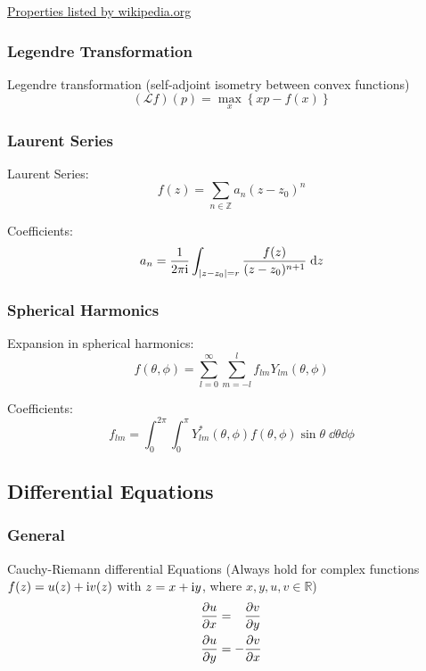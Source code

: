 			\noindent
			\href{https://en.wikipedia.org/wiki/Fourier_transform#Functional_relationships,_one-dimensional}{Properties listed by wikipedia.org}

		\subsubsection{Legendre Transformation}
			\noindent
			Legendre transformation (self-adjoint isometry between convex functions)
			\begin{equation}
				(\mathcal{L}f)(p)=\max_x\left\lbrace xp-f(x) \right\rbrace
			\end{equation}


		\subsubsection{Laurent Series}
			\noindent
			Laurent Series:
			\begin{equation}
				f(z)=\sum_{n\in\mathbb{Z}} a_n(z-z_0)^n
			\end{equation}

			\noindent
			Coefficients:
			\begin{equation}
				a_n = \frac{1}{2 \pi \mathrm{i}}\int_{\abs{ z-z_0 } = r} \frac{f(z)}{(z-z_0)^{n+1}}\;\dd z
			\end{equation}

		\subsubsection{Spherical Harmonics}
			\noindent
			Expansion in spherical harmonics:
			\begin{equation}
				f(\theta, \phi) = \sum_{l=0}^{\infty} \sum_{m=-l}^{l} f_{lm} Y_{lm}(\theta,\phi)
			\end{equation}

			\noindent
			Coefficients:
			\begin{equation}
				f_{lm} = \int_0^{2\pi} \int_0^\pi Y_{lm}^{*}(\theta,\phi) f(\theta,\phi) \sin\theta\;\dd\theta\dd\phi
			\end{equation}

	\subsection{Differential Equations}
		\subsubsection{General}
			\noindent
			Cauchy-Riemann differential Equations (Always hold for complex functions $f(z)=u(z)+\mathrm{i} v(z)$ with $z=x+\mathrm{i} y$, where $x,y,u,v\in\mathbb{R}$)
			\begin{equation}
				\begin{aligned}
					\pdv{u}{x} &= \phantom{-}\pdv{v}{y} \\
					\pdv{u}{y} &= -\pdv{v}{x} \\
				\end{aligned}
			\end{equation}


